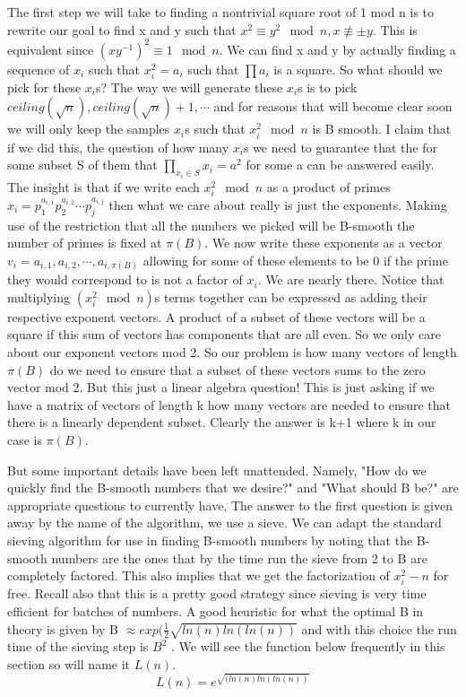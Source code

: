 \documentclass{article}
\begin{document}
The first step we will take to finding a nontrivial square root of 1 mod n is to rewrite our goal to find x and y such that $x^2 \equiv y^2 \mod n, x \not \equiv \pm y$. This is equivalent since $(xy^{-1})^2 \equiv 1 \mod n$.  We can find x and y by actually finding a sequence of $x_i$ such that $x_i^2 = a_i$ such that $\prod a_i $ is a square. So what should we pick for these $x_i$s? The way we will generate these $x_i$s is to pick $ceiling( \sqrt{n}), ceiling(\sqrt{n}) + 1, \cdots$ and for reasons that will become clear soon we will only keep the samples $x_i$s such that $x_i^2 \mod n$ is B smooth. I claim that if we did this, the question of how many $x_i$s we need to guarantee that the for some subset S of them that $\prod_{x_i \in S} x_i = a^2$ for some a can be answered easily. The insight is that if we write each $x_i^2 \mod n$ as a product of primes 
$x_i = p_1^{a_{i,1}} p_2^{a_{i,2}} \cdots p_j^{a_{i,j}}$ then what we care about really is just the exponents. Making use of the restriction that all the numbers we picked will be B-smooth the number of primes is fixed at $\pi (B)$. We now write these exponents as a vector $v_i = a_{i,1}, a_{i,2}, \cdots, a_{i, \pi (B)}$ allowing for some of these elements to be 0 if the prime they would correspond to is not a factor of $x_i$. We are nearly there. Notice that multiplying $(x_i^2 \mod n)$s terms together can be expressed as adding their respective exponent vectors. A product of a subset of these vectors will be a square if this sum of vectors has components that are all even. So we only care about our exponent vectors mod 2. So our problem is how many vectors of length $\pi (B)$ do we need to ensure that a subset of these vectors sums to the zero vector mod 2. But this just a linear algebra question! This is just asking if we have a matrix of vectors of length k how many vectors are needed to ensure that there is a linearly dependent subset. Clearly the answer is k+1 where k in our case is $\pi(B)$. 

But some important details have been left unattended. Namely, "How do we quickly find the B-smooth numbers that we desire?" and "What should B be?" are appropriate questions to currently have.  The answer to the first question is given away by the name of the algorithm, we use a sieve. We can adapt the standard sieving algorithm for use in finding B-smooth numbers by noting that the B-smooth numbers are the ones that by the time run the sieve from 2 to B are completely factored. This also implies that we get the factorization of $x_i^2 - n$ for free. Recall also that this is a pretty good strategy since sieving is very time efficient for batches of numbers. A good heuristic for what the optimal B in theory is given by B $\approx exp( \frac{1}{2} \sqrt{ln ( n) ln ( ln ( n ) )}$ and with this choice the run time of the sieving step is $B^2$ \cite{crandall2006prime}.   We will see the function below frequently in this section so will name it $L(n)$. 
\begin{equation}
    L(n) = e^{\sqrt{(ln ( n ) ln ( ln ( n) )}}
\end{equation}
\end{document}
